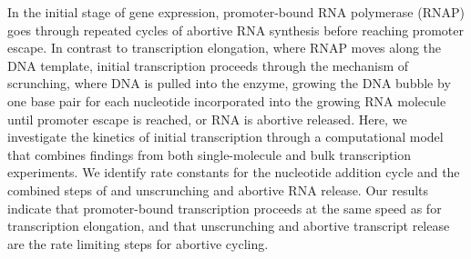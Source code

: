 In the initial stage of gene expression, promoter-bound RNA polymerase (RNAP)
goes through repeated cycles of abortive RNA synthesis before reaching
promoter escape. In contrast to transcription elongation, where RNAP moves
along the DNA template, initial transcription proceeds through the mechanism
of scrunching, where DNA is pulled into the enzyme, growing the DNA bubble by
one base pair for each nucleotide incorporated into the growing RNA molecule
until promoter escape is reached, or RNA is abortive released. Here, we
investigate the kinetics of initial transcription through a computational
model that combines findings from both single-molecule and bulk transcription
experiments. We identify rate constants for the nucleotide addition cycle and
the combined steps of and unscrunching and abortive RNA release. Our results
indicate that promoter-bound transcription proceeds at the same speed as for
transcription elongation, and that unscrunching and abortive transcript release
are the rate limiting steps for abortive cycling.
